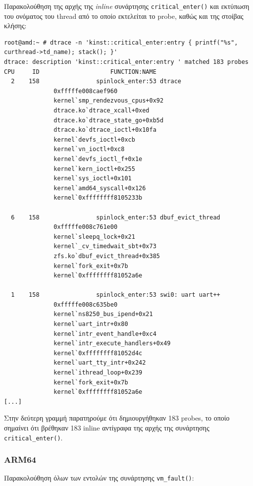 \documentclass[12pt]{article}
\begin{document}
Παρακολούθηση της αρχής της \textit{inline} συνάρτησης
\lstinline{critical_enter()} και εκτύπωση του ονόματος του thread από το οποίο
εκτελείται το probe, καθώς και της στοίβας κλήσης:

\begin{lstlisting}
root@amd:~ # dtrace -n 'kinst::critical_enter:entry { printf("%s", curthread->td_name); stack(); }'
dtrace: description 'kinst::critical_enter:entry ' matched 183 probes
CPU     ID                    FUNCTION:NAME
  2    158                spinlock_enter:53 dtrace
              0xfffffe008caef960
              kernel`smp_rendezvous_cpus+0x92
              dtrace.ko`dtrace_xcall+0xed
              dtrace.ko`dtrace_state_go+0xb5d
              dtrace.ko`dtrace_ioctl+0x10fa
              kernel`devfs_ioctl+0xcb
              kernel`vn_ioctl+0xc8
              kernel`devfs_ioctl_f+0x1e
              kernel`kern_ioctl+0x255
              kernel`sys_ioctl+0x101
              kernel`amd64_syscall+0x126
              kernel`0xffffffff8105233b
	      
  6    158                spinlock_enter:53 dbuf_evict_thread
              0xfffffe008c761e00
              kernel`sleepq_lock+0x21
              kernel`_cv_timedwait_sbt+0x73
              zfs.ko`dbuf_evict_thread+0x385
              kernel`fork_exit+0x7b
              kernel`0xffffffff81052a6e

  1    158                spinlock_enter:53 swi0: uart uart++
              0xfffffe008c635be0
              kernel`ns8250_bus_ipend+0x21
              kernel`uart_intr+0x80
              kernel`intr_event_handle+0xc4
              kernel`intr_execute_handlers+0x49
              kernel`0xffffffff81052d4c
              kernel`uart_tty_intr+0x242
              kernel`ithread_loop+0x239
              kernel`fork_exit+0x7b
              kernel`0xffffffff81052a6e
[...]
\end{lstlisting}

Στην δεύτερη γραμμή παρατηρούμε ότι δημιουργήθηκαν 183 probes, το οποίο
σημαίνει ότι βρέθηκαν 183 inline αντίγραφα της αρχής της συνάρτησης
\lstinline{critical_enter()}.

\subsubsection{ARM64}

Παρακολούθηση όλων των εντολών της συνάρτησης \lstinline{vm_fault()}:
\end{document}

